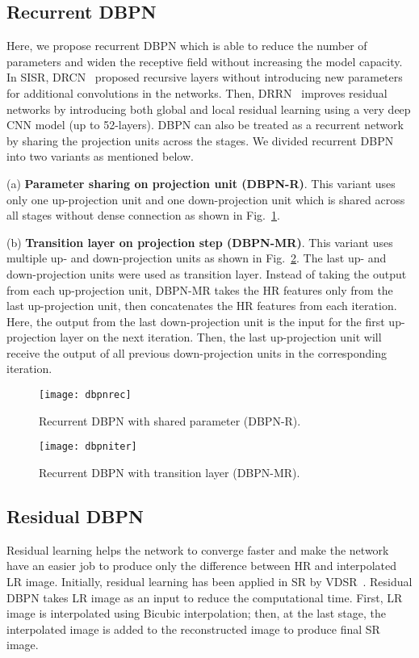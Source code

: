 \documentclass[10pt,journal,compsoc]{IEEEtran}
\begin{document}
\subsection{Recurrent DBPN}
\label{subsec:recurrent_dbpn}
Here, we propose recurrent DBPN which is able to reduce the number of parameters and widen the receptive field without increasing the model capacity.
In SISR, DRCN~\cite{kim2016deeply} proposed recursive layers without introducing new parameters for additional convolutions in the networks. 
Then, DRRN~\cite{Tai-DRRN-2017} improves residual networks by introducing both global and local residual learning using a very deep CNN model (up to 52-layers).
DBPN can also be treated as a recurrent network by sharing the projection units across the stages. We divided recurrent DBPN into two variants as mentioned below.

\noindent(a) \textbf{Parameter sharing on projection unit (DBPN-R)}. 
This variant uses only one up-projection unit and one down-projection unit which is shared across all stages without dense connection as shown in Fig.~\ref{figure:dbpnrec}. 

\noindent(b) \textbf{Transition layer on projection step (DBPN-MR)}. 
This variant uses multiple up- and down-projection units as shown in Fig.~\ref{figure:dbpniter}. 
The last up- and down-projection units were used as transition layer. 
Instead of taking the output from each up-projection unit, DBPN-MR takes the HR features only from the last up-projection unit, then concatenates the HR features from each iteration. 
Here, the output from the last down-projection unit is the input for the first up-projection layer on the next iteration.
Then, the last up-projection unit will receive the output of all previous down-projection units in the corresponding iteration.

\begin{figure}[t!]
\centering
\texttt{[image: dbpnrec]}\vspace{-1.5em}
\caption{Recurrent DBPN with shared parameter (DBPN-R).}
\label{figure:dbpnrec}
\end{figure}

\begin{figure}[t!]
\centering
\texttt{[image: dbpniter]}\vspace{-1.5em}
\caption{Recurrent DBPN with transition layer (DBPN-MR).}
\label{figure:dbpniter}
\end{figure}

\subsection{Residual DBPN}
\label{subsec:residual_dbpn}
Residual learning helps the network to converge faster and make the network have an easier job to produce only the difference between HR and interpolated LR image.
Initially, residual learning has been applied in SR by VDSR~\cite{Kim_2016_VDSR}.
Residual DBPN takes LR image as an input to reduce the computational time.
First, LR image is interpolated using Bicubic interpolation; then, at the last stage, the interpolated image is added to the reconstructed image to produce final SR image.
\end{document}
